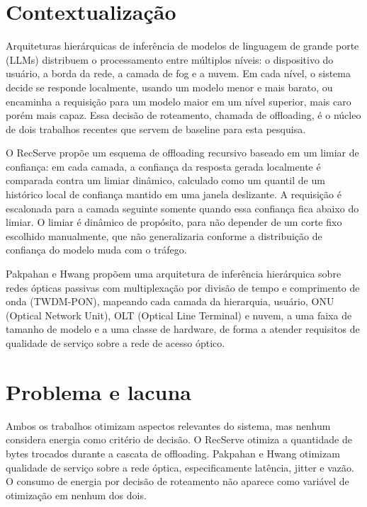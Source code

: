 \documentclass[cic,dipl]{infufrgs}
\begin{document}
\section{Contextualiza\c{c}\~ao}

Arquiteturas hier\'arquicas de infer\^encia de modelos de linguagem de
grande porte (LLMs) distribuem o processamento entre m\'ultiplos n\'iveis:
o dispositivo do usu\'ario, a borda da rede, a camada de fog e a nuvem. Em
cada n\'ivel, o sistema decide se responde localmente, usando um modelo
menor e mais barato, ou encaminha a requisi\c{c}\~ao para um modelo maior
em um n\'ivel superior, mais caro por\'em mais capaz. Essa decis\~ao de
roteamento, chamada de offloading, \'e o n\'ucleo de dois trabalhos
recentes que servem de baseline para esta pesquisa.

O RecServe \cite{wu2025recserve} prop\~oe um esquema de offloading
recursivo baseado em um limiar de confian\c{c}a: em cada camada, a
confian\c{c}a da resposta gerada localmente \'e comparada contra um
limiar din\^amico, calculado como um quantil de um hist\'orico local de
confian\c{c}a mantido em uma janela deslizante. A requisi\c{c}\~ao \'e
escalonada para a camada seguinte somente quando essa confian\c{c}a fica
abaixo do limiar. O limiar \'e din\^amico de prop\'osito, para n\~ao
depender de um corte fixo escolhido manualmente, que n\~ao generalizaria
conforme a distribui\c{c}\~ao de confian\c{c}a do modelo muda com o
tr\'afego.

Pakpahan e Hwang \cite{pakpahan2026continuum} prop\~oem uma arquitetura de
infer\^encia hier\'arquica sobre redes \'opticas passivas com
multiplexa\c{c}\~ao por divis\~ao de tempo e comprimento de onda
(TWDM-PON), mapeando cada camada da hierarquia, usu\'ario, ONU (Optical
Network Unit), OLT (Optical Line Terminal) e nuvem, a uma faixa de
tamanho de modelo e a uma classe de hardware, de forma a atender
requisitos de qualidade de servi\c{c}o sobre a rede de acesso \'optico.

\section{Problema e lacuna}

Ambos os trabalhos otimizam aspectos relevantes do sistema, mas nenhum
considera energia como crit\'erio de decis\~ao. O RecServe otimiza a
quantidade de bytes trocados durante a cascata de offloading. Pakpahan e
Hwang otimizam qualidade de servi\c{c}o sobre a rede \'optica,
especificamente lat\^encia, jitter e vaz\~ao. O consumo de energia por
decis\~ao de roteamento n\~ao aparece como vari\'avel de otimiza\c{c}\~ao
em nenhum dos dois.
\end{document}

